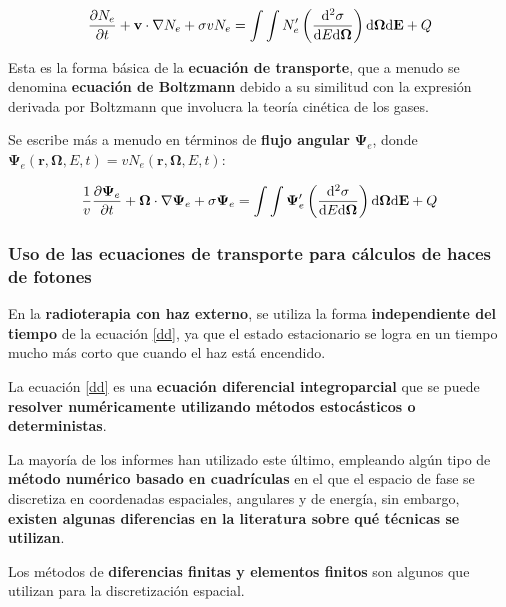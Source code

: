 \documentclass[aspectratio=169,xcolor=dvipsnames,t]{beamer}
\newcommand{\be}{\begin{equation*}}
\newcommand{\ee}{\end{equation*}}
\newcommand{\bae}{\begin{eqnarray}}
\newcommand{\eae}{\end{eqnarray}}
\newcommand{\pl}{\left(}
\newcommand{\pr}{\right)}
\begin{document}
\begin{frame}

    \vspace{0.3cm}

    \be
    \pdv{N_e}{t} + \mathbf{v} \cdot \nabla N_e + \sigma v N_e = \int \int N_e' \pl \frac{\dd[2]{\sigma}}{\dd E \dd \bm{\Omega}} \pr \text{d}\bm{\Omega} \text{d}\mathbf{E} + Q
    \ee

    Esta es la forma básica de la \textbf{ecuación de transporte}, que a menudo se denomina \textbf{ecuación de Boltzmann} debido a su similitud con la expresión derivada por Boltzmann que involucra la teoría cinética de los gases.

    Se escribe más a menudo en términos de \textbf{flujo angular} $\bm{\Psi}_e$,  donde $\bm{\Psi}_e(\mathbf{r},\bm{\Omega},E,t) = v N_e(\mathbf{r},\bm{\Omega},E,t)$:

    \bae
    \frac{1}{v}\pdv{\bm{\Psi}_e}{t} + \bm{\Omega} \cdot \nabla \bm{\Psi}_e + \sigma \bm{\Psi}_e = \int \int \bm{\Psi}_e' \pl \frac{\dd[2]{\sigma}}{\dd E \dd \bm{\Omega}} \pr \text{d}\bm{\Omega} \text{d}\mathbf{E} + Q
    \eae

\end{frame}

\begin{frame}

    \frametitle{Uso de las ecuaciones de transporte para cálculos de haces de fotones}

    En la \textbf{radioterapia con haz externo}, se utiliza la forma \textbf{independiente del tiempo} de la ecuación \eqref{dd}, ya que el estado estacionario se logra en un tiempo mucho más corto que cuando el haz está encendido.

    La ecuación \eqref{dd} es una \textbf{ecuación diferencial integroparcial} que se puede \textbf{resolver numéricamente utilizando métodos estocásticos o deterministas}.

    La mayoría de los informes han utilizado este último, empleando algún tipo de \textbf{método numérico basado en cuadrículas} en el que el espacio de fase se discretiza en coordenadas espaciales, angulares y de energía, sin embargo, \textbf{existen algunas diferencias en la literatura sobre qué técnicas se utilizan}.

    Los métodos de \textbf{diferencias finitas y elementos finitos} son algunos que utilizan para la discretización espacial.

\end{frame}
\end{document}
